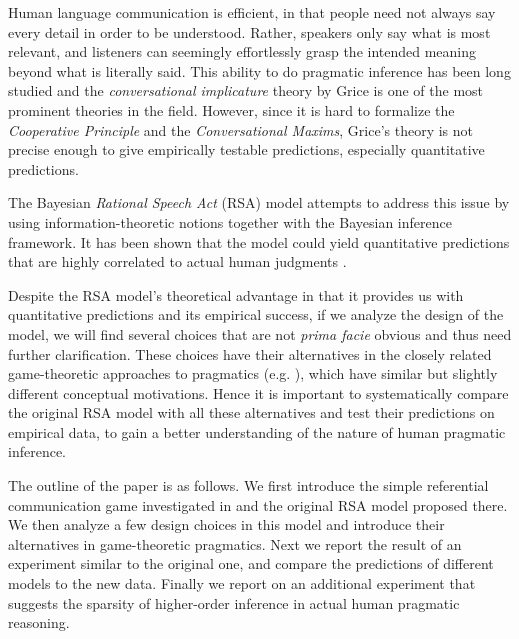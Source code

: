 Human language communication is efficient, in that people need not always say every detail in order to be understood. Rather, speakers only say what is most relevant, and listeners can seemingly effortlessly grasp the intended meaning beyond what is literally said. This ability to do pragmatic inference has been long studied and the \emph{conversational implicature} theory by Grice \cite{Grice} is one of the most prominent theories in the field. However, since it is hard to formalize the \emph{Cooperative Principle} and the \emph{Conversational Maxims}, Grice's theory is not precise enough to give empirically testable predictions, especially quantitative predictions.

The Bayesian \emph{Rational Speech Act} (RSA) model attempts to address this issue by using information-theoretic notions together with the Bayesian inference framework. It has been shown that the model could yield quantitative predictions that are highly correlated to actual human judgments \cite{Frank}.

Despite the RSA model's theoretical advantage in that it provides us with quantitative predictions and its empirical success, if we analyze the design of the model, we will find several choices that are not \emph{prima facie} obvious and thus need further clarification. These choices have their alternatives in the closely related game-theoretic approaches to pragmatics (e.g. \cite{Benz2007,Jager2013}), which have similar but slightly different conceptual motivations. Hence it is important to systematically compare the original RSA model with all these alternatives and test their predictions on empirical data, to gain a better understanding of the nature of human pragmatic inference.

The outline of the paper is as follows. We first introduce the simple referential communication game investigated in \cite{Frank} and the original RSA model proposed there. We then analyze a few design choices in this model and introduce their alternatives in game-theoretic pragmatics. Next we report the result of an experiment similar to the original one, and compare the predictions of different models to the new data. Finally we report on an additional experiment that suggests the sparsity of higher-order inference in actual human pragmatic reasoning.
